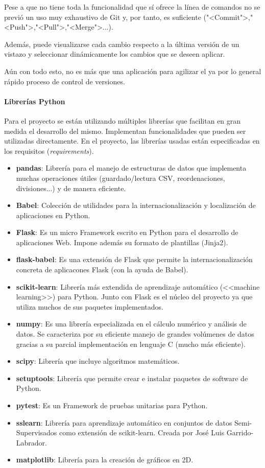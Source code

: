Pese a que no tiene toda la funcionalidad que sí ofrece la línea de comandos no
se previó un uso muy exhaustivo de Git y, por tanto, es suficiente
("<Commit">,"<Push">,"<Pull">,"<Merge">...).

Además, puede visualizarse cada cambio respecto a la última versión de un
vistazo y seleccionar dinámicamente los cambios que se deseen aplicar.

Aún con todo esto, no es más que una aplicación para agilizar el ya por lo
general rápido proceso de control de versiones.

\paragraph{Librerías Python}
Para el proyecto se están utilizando múltiples librerías que facilitan en gran
medida el desarrollo del mismo. Implementan funcionalidades que pueden ser
utilizadas directamente. En el proyecto, las librerías usadas están
especificadas en los requisitos (\textit{requirements}).

\begin{itemize}
	\item \textbf{pandas}: Librería para el manejo de estructuras de datos que implementa
	muchas operaciones útiles (guardado/lectura CSV, reordenaciones,
	divisiones...) y de manera eficiente.
	\item \textbf{Babel}: Colección de utilidades para la internacionalización y
	localización de aplicaciones en Python.
	\item \textbf{Flask}: Es un micro Framework escrito en Python para el desarrollo de
	aplicaciones Web. Impone además su formato de plantillas (Jinja2).
	\item \textbf{flask-babel}: Es una extensión de Flask que permite la
	internacionalización concreta de aplicacones Flask (con la ayuda de Babel).
	\item \textbf{scikit-learn}: Librería más extendida de aprendizaje automático
	(<<machine learning>>) para Python. Junto con Flask es el núcleo del
	proyecto ya que utiliza muchos de sus paquetes implementados.
	\item \textbf{numpy}: Es una librería especializada en el cálculo numérico y análisis
	de datos. Se caracteriza por su eficiente manejo de grandes volúmenes de
	datos gracias a su parcial implementación en lenguaje C (mucho más
	eficiente).
	\item \textbf{scipy}: Librería que incluye algoritmos matemáticos.
	\item \textbf{setuptools}: Librería que permite crear e instalar paquetes de
	software de Python.
	\item \textbf{pytest}: Es un Framework de pruebas unitarias para Python.
	\item \textbf{sslearn}: Librería para aprendizaje automático en conjuntos de datos
	Semi-Supervisados como extensión de scikit-learn. Creada por José Luis Garrido-Labrador.
	\item \textbf{matplotlib}: Librería para la creación de gráficos en 2D.
\end{itemize}

